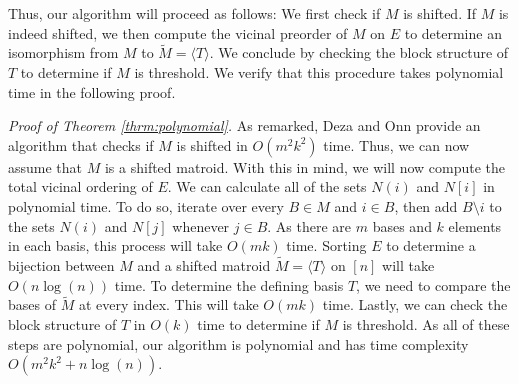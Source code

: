 \documentclass{amsart}
\theoremstyle{definition}
\theoremstyle{plain}
\begin{document}
Thus, our algorithm will proceed as follows:
We first check if $M$ is shifted. If $M$ is indeed shifted, we then compute the vicinal preorder of $M$ on $E$ to determine an isomorphism from $M$ to $\tilde M=\langle T \rangle$. We conclude by checking the block structure of $T$ to determine if $M$ is threshold. We verify that this procedure takes polynomial time in the following proof.

\vspace{1em}

\noindent \emph{Proof of Theorem \ref{thrm:polynomial}.} As remarked, Deza and Onn \cite[Section $8$]{DO} provide an algorithm that checks if $M$ is shifted in $O(m^2k^2)$ time. Thus, we can now assume that $M$ is a shifted matroid. With this in mind, we will now compute the total vicinal ordering of $E$. We can calculate all of the sets $N(i)$ and $N[i]$ in polynomial time. To do so, iterate over every $B\in M$ and $i\in B$, then add $B\setminus i$ to the sets $N(i)$ and $N[j]$ whenever $j\in B$. As there are $m$ bases and $k$ elements in each basis, this process will take $O(mk)$ time. Sorting $E$ to determine a bijection between $M$ and a shifted matroid $\tilde M= \langle T \rangle$ on $[n]$ will take $O(n\log(n))$ time. To determine the defining basis $T$, we need to compare the bases of $\tilde M$ at every index. This will take $O(mk)$ time. Lastly, we can check the block structure of $T$ in $O(k)$ time to determine if $M$ is threshold. As all of these steps are polynomial, our algorithm is polynomial and has time complexity $O(m^{2}k^{2}+n\log(n))$.

\printbibliography
\end{document}
